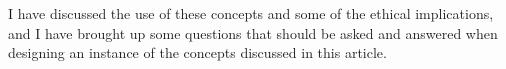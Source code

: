 \documentclass[fleqn,10pt]{wlscirep}
\begin{document}
I have discussed the use of these concepts and some of the ethical implications, and I have brought up some questions that should be asked and answered when designing an instance of the concepts discussed in this article.


\end{document}
